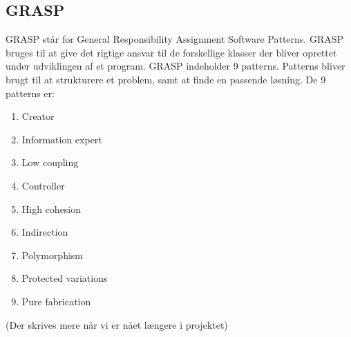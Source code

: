 \subsection{GRASP}
GRASP står for General Responsibility Assignment Software Patterns. GRASP bruges til at give det rigtige ansvar til de forskellige klasser der bliver oprettet under udviklingen af et program. GRASP indeholder 9 patterns. Patterns bliver brugt til at strukturere et problem, samt at finde en passende løsning. De 9 patterns er:
\begin{enumerate}
    \item Creator
    \item Information expert
    \item Low coupling
    \item Controller
    \item High cohesion
    \item Indirection
    \item Polymorphism
    \item Protected variations
    \item Pure fabrication
\end{enumerate}
(Der skrives mere når vi er nået længere i projektet)
